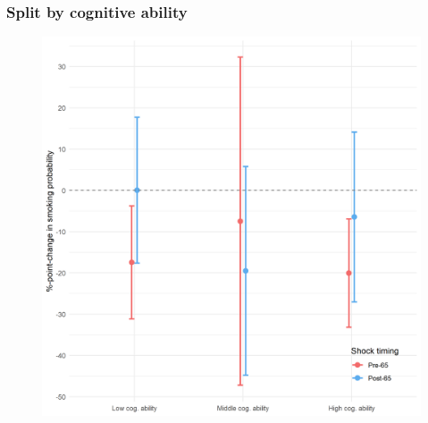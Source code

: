 \documentclass[10pt,compress,xcolor=dvipsnames]{beamer}    %
\newcounter{ex}
\newcommand{\1}[1]{\mathrm{1\hspace*{-2.5pt}l}[#1]}	%
\begin{document}
\begin{frame}
\frametitle{Split by cognitive ability}

\begin{figure}[hbtp]
\centering
\includegraphics[height=0.8\textheight]{../../3_output/shock_effects/cog_6070_100_cvplot.png}
\label{fig:cog}
\end{figure}
\hyperlink{frame:otherX}{}
\end{frame}
\end{document}
